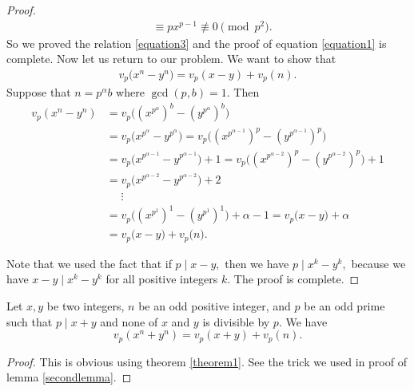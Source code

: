 \documentclass[main.tex]{subfile}
\begin{document}
\begin{proof}
\begin{align*}
                & \equiv px^{p-1} \not \equiv 0 \pmod{p^2}.
            \end{align*}
        So we proved the relation \eqref{equation3} and the proof of equation \eqref{equation1} is complete.  Now let us return to our problem. We want to show that
            \begin{align*}
            v_p\big(  x^n - y^n \big) = v_p(  x - y ) + v_p(  n ).
            \end{align*}
        Suppose that $n=p^{\alpha}b$ where $\gcd(p,b)=1.$ Then
            \begin{align*}
                v_p(x^n-y^n) & =  v_p\big((x^{p^{\alpha}})^b - (y^{p^{\alpha}})^b \big)  \\
                & =   v_p\big(  x^{p^{\alpha}} -y^{p^{\alpha}}\big) =v_p\big(  (x^{p^{\alpha-1}})^p - (y^{p^{\alpha-1}})^p \big) \\
                & = v_p\big(  x^{p^{\alpha-1}} - y^{p^{\alpha-1}} \big) + 1 =v_p\big(  (x^{p^{\alpha-2}})^p - (y^{p^{\alpha-2}})^p\big) +1  \\
                & = v_p\big(  x^{p^{\alpha-2}} - y^{p^{\alpha-2}} \big) + 2 \\
                & \phantom{=} \vdots \\
                & = v_p\big(  (x^{p^{1}})^1 - (y^{p^{1}})^1  \big) + \alpha -1  = v_p\big(  x-y \big) + \alpha \\
                & =v_p\big(  x-y \big) + v_p\big(  n \big) . 
            \end{align*}
        
        Note that we used the fact that if $p \mid x-y,$ then we have $p \mid x^k -y^k,$ because we have $x-y \mid x^k-y^k$ for all positive integers $k.$ The proof is complete.
    \end{proof}



    \begin{theorem}\label{theorem2}
        Let $ x,y$ be two integers, $n$ be an odd positive integer, and $p$ be an odd prime such that $ p\mid x + y$ and none of
        $x$ and $y$ is divisible by $p.$  We have
        \[ v_p(  x^n + y^n ) = v_p(  x + y ) + v_p(  n ). \]
    \end{theorem}

    \begin{proof} 
        This is obvious using theorem \eqref{theorem1}. See the trick we used in proof of lemma \eqref{secondlemma}.
	\end{proof}
    
\end{document}
